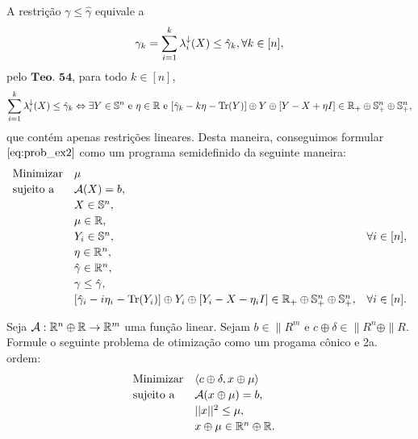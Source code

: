 \begin{homeworkProblemAnswer}
A restrição $\gamma \leq \hat{\gamma}$ equivale a
$$ \gamma_k = \sum \limits_{i=1}^k \eigen_i(X) \leq \hat{\gamma}_k, \forall k \in [n], $$
pelo $\textbf{Teo. 54}$, para todo $k \in [n]$, 
$$  
    \sum \limits_{i=1}^k \eigen_i(X) \leq \hat{\gamma}_k \sse 
    \exists Y \in \|{S}^n \text{ e } \eta \in \|{R} \text{ e } [\hat{\gamma}_k - k\eta - \Tr(Y)] \oplus Y \oplus [Y - X + \eta I] \in \|{R}_+ \oplus \|{S}_+^n \oplus \|{S}_+^n,
$$
que contém apenas restrições lineares. Desta maneira, conseguimos formular $\eqref{eq:prob_ex2}$ como um programa semidefinido da seguinte maneira:
\begin{equation*}
    \begin{array}[!h]{lll}
        \text{Minimizar} & \mu                                              & \\[2pt]
        \text{sujeito a} & \"{A}(X) = b,                                    & \\[2pt]
                         & X \in \|{S}^n,                                   & \\[2pt]
                         & \mu \in \|{R},                                   & \\[2pt]
                         & Y_i \in \|{S}^n,                                 & \forall i \in [n], \\[2pt]
                         & \eta \in \|{R}^n,                                & \\[2pt]
                         & \hat{\gamma} \in \|{R}^n,                        & \\[2pt]
                         & \gamma \leq \hat{\gamma},                        & \\[2pt]
    & [\hat{\gamma}_i - i\eta_i - \Tr(Y_i)] \oplus Y_i \oplus [Y_i - X - \eta_iI] \in \|{R}_+ \oplus \|{S}_+^n \oplus \|{S}_+^n,&  \forall i \in [n].\\
    \end{array}
\end{equation*}


\end{homeworkProblemAnswer}

\begin{homeworkProblem}
Seja $\"{A} : \|{R}^n \oplus \|{R} \rightarrow \|{R}^m$ uma função linear. Sejam $b \in \|{R}^m$ e $c \oplus \delta \in \|{R}^n \oplus \|{R}$. Formule o seguinte problema de otimização como um progama cônico e 2a. ordem:
\begin{equation} \label{eq:prob_ex3}
    \begin{array}[!h]{lll}
        \text{Minimizar} & \langle c \oplus \delta, x \oplus \mu \rangle    & \\[2pt]
        \text{sujeito a} & \"{A}(x \oplus \mu) = b,                          & \\[2pt]
                         & ||x||^2 \leq \mu,                                & \\[2pt]
                         & x \oplus \mu \in \|{R}^n \oplus \|{R}.           & \\
    \end{array}
\end{equation}
\end{homeworkProblem}

